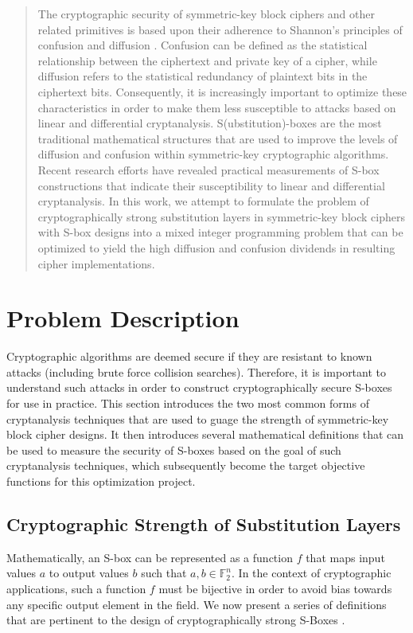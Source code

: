 \documentclass[11pt]{article}
\newcommand{\field}[1]{\mathbb{#1}} %
\begin{document}

\begin{abstract}
The cryptographic security of symmetric-key block ciphers and other related primitives is based upon their adherence to Shannon's principles of confusion and diffusion \cite{Kim90astudy}. Confusion can be defined as the statistical relationship between the ciphertext and private key of a cipher, while diffusion refers to the statistical redundancy of plaintext bits in the ciphertext bits. Consequently, it is increasingly important to optimize these characteristics in order to make them less susceptible to attacks based on linear and differential cryptanalysis. S(ubstitution)-boxes are the most traditional mathematical structures that are used to improve the levels of diffusion and confusion within symmetric-key cryptographic algorithms. Recent research efforts have revealed practical measurements of S-box constructions that indicate their susceptibility to linear and differential cryptanalysis. In this work, we attempt to formulate the problem of cryptographically strong substitution layers in symmetric-key block ciphers with S-box designs into a mixed integer programming problem that can be optimized to yield the high diffusion and confusion dividends in resulting cipher implementations.
\end{abstract}

\section{Problem Description}
Cryptographic algorithms are deemed secure if they are resistant to known attacks (including brute force collision searches). Therefore, it is important to understand such attacks in order to construct cryptographically secure S-boxes for use in practice. This section introduces the two most common forms of cryptanalysis techniques that are used to guage the strength of symmetric-key block cipher designs. It then introduces several mathematical definitions that can be used to measure the security of S-boxes based on the goal of such cryptanalysis techniques, which subsequently become the target objective functions for this optimization project.

\subsection{Cryptographic Strength of Substitution Layers}
Mathematically, an S-box can be represented as a function $f$ that maps input values $a$ to output values $b$ such that $a,b \in \field{F}_2^n$. In the context of cryptographic applications, such a function $f$ must be bijective in order to avoid bias towards any specific output element in the field. We now present a series of definitions that are pertinent to the design of cryptographically strong S-Boxes \cite{Mar_newanalysis}.
\end{document}
